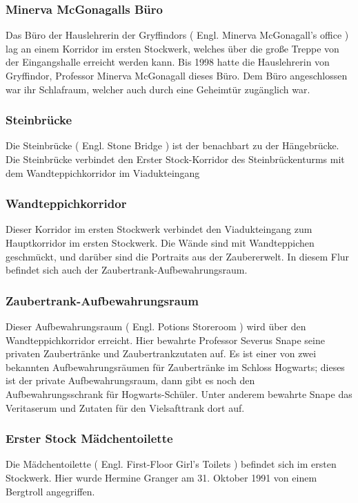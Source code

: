 \documentclass[a4paper, 10pt]{article}
\begin{document}
\subsubsection*{\large Minerva McGonagalls Büro}
Das Büro der Hauslehrerin der Gryffindors (  Engl.  Minerva McGonagall's office ) lag an einem Korridor im ersten Stockwerk, welches über die große Treppe von der Eingangshalle erreicht werden kann. Bis 1998 hatte die Hauslehrerin von Gryffindor, Professor Minerva McGonagall dieses Büro. Dem Büro angeschlossen war ihr Schlafraum, welcher auch durch eine Geheimtür zugänglich war.
\subsubsection*{\large Steinbrücke}
Die Steinbrücke (  Engl.  Stone Bridge ) ist der benachbart zu der Hängebrücke. Die Steinbrücke verbindet den Erster Stock-Korridor des Steinbrückenturms mit dem Wandteppichkorridor im Viadukteingang
\subsubsection*{\large Wandteppichkorridor}
Dieser Korridor im ersten Stockwerk verbindet den Viadukteingang zum Hauptkorridor im ersten Stockwerk. Die Wände sind mit Wandteppichen geschmückt, und darüber sind die Portraits aus der Zaubererwelt. In diesem Flur befindet sich auch der Zaubertrank-Aufbewahrungsraum.
\subsubsection*{\large Zaubertrank-Aufbewahrungsraum}
Dieser Aufbewahrungsraum (  Engl.  Potions Storeroom ) wird über den Wandteppichkorridor erreicht. Hier bewahrte Professor Severus Snape seine privaten Zaubertränke und Zaubertrankzutaten auf. Es ist einer von zwei bekannten Aufbewahrungsräumen für Zaubertränke im Schloss Hogwarts; dieses ist der private Aufbewahrungsraum, dann gibt es noch den Aufbewahrungsschrank für Hogwarts-Schüler. Unter anderem bewahrte Snape das Veritaserum und Zutaten für den Vielsafttrank dort auf.
\subsubsection*{\large Erster Stock Mädchentoilette}
Die Mädchentoilette (  Engl.  First-Floor Girl's Toilets ) befindet sich im ersten Stockwerk. Hier wurde Hermine Granger am 31. Oktober 1991 von einem Bergtroll angegriffen.
\end{document}

